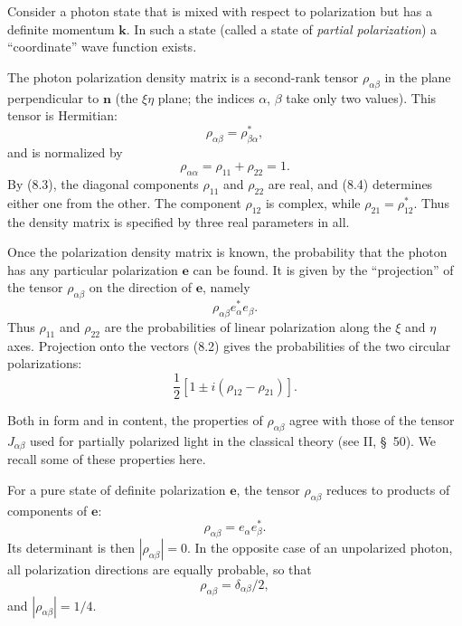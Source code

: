 Consider a photon state that is mixed with respect to polarization but has a definite momentum $\mathbf{k}$. In such a state (called a state of \emph{partial polarization}) a ``coordinate'' wave function exists.

The photon polarization density matrix is a second-rank tensor $\rho_{\alpha\beta}$ in the plane perpendicular to $\mathbf{n}$ (the $\xi\eta$ plane; the indices $\alpha$, $\beta$ take only two values). This tensor is Hermitian:
\begin{equation}
\rho_{\alpha\beta}=\rho^*_{\beta\alpha},
\tag{8.3}
\end{equation}
and is normalized by
\begin{equation}
\rho_{\alpha\alpha}=\rho_{11}+\rho_{22}=1.
\tag{8.4}
\end{equation}
By (8.3), the diagonal components $\rho_{11}$ and $\rho_{22}$ are real, and (8.4) determines either one from the other. The component $\rho_{12}$ is complex, while $\rho_{21}=\rho^*_{12}$. Thus the density matrix is specified by three real parameters in all.

Once the polarization density matrix is known, the probability that the photon has any particular polarization $\mathbf{e}$ can be found. It is given by the ``projection'' of the tensor $\rho_{\alpha\beta}$ on the direction of $\mathbf{e}$, namely
\begin{equation}
\rho_{\alpha\beta}e^*_\alpha e_\beta.
\tag{8.5}
\end{equation}
Thus $\rho_{11}$ and $\rho_{22}$ are the probabilities of linear polarization along the $\xi$ and $\eta$ axes. Projection onto the vectors (8.2) gives the probabilities of the two circular polarizations:
\begin{equation}
\frac{1}{2}[1\pm i(\rho_{12}-\rho_{21})].
\tag{8.6}
\end{equation}

Both in form and in content, the properties of $\rho_{\alpha\beta}$ agree with those of the tensor $J_{\alpha\beta}$ used for partially polarized light in the classical theory (see II, \S~50). We recall some of these properties here.

For a pure state of definite polarization $\mathbf{e}$, the tensor $\rho_{\alpha\beta}$ reduces to products of components of $\mathbf{e}$:
\begin{equation}
\rho_{\alpha\beta}=e_\alpha e^*_\beta.
\tag{8.7}
\end{equation}
Its determinant is then $|\rho_{\alpha\beta}|=0$. In the opposite case of an unpolarized photon, all polarization directions are equally probable, so that
\begin{equation}
\rho_{\alpha\beta}=\delta_{\alpha\beta}/2,
\tag{8.8}
\end{equation}
and $|\rho_{\alpha\beta}|=1/4$.

